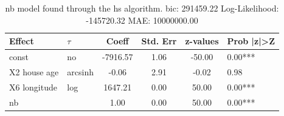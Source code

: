 \begin{table}
	\caption{nb model found through the hs algorithm. bic: 291459.22 Log-Likelihood: -145720.32 MAE: 10000000.00}
	\begin{center}
		\begin{tabular}{|l|l|c|c|c|l|}
			\hline
			Effect & $\tau$ & Coeff & Std. Err & z-values & Prob |z|>Z \\
			\hline
			const & no & -7916.57 & 1.06 & -50.00 & 0.00*** \\
			\hline
			X2 house age & arcsinh & -0.06 & 2.91 & -0.02 & 0.98 \\
			\hline
			X6 longitude & log & 1647.21 & 0.00 & 50.00 & 0.00*** \\
			\hline
			nb &  & 1.00 & 0.00 & 50.00 & 0.00*** \\
			\hline
		\end{tabular}
	\end{center}
\end{table}